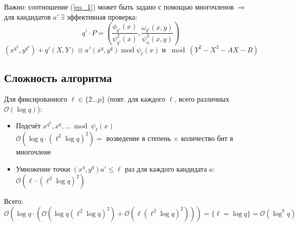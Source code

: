\documentclass[12pt]{article}
\newcommand{\bigO}{\mathcal{O}}
\theoremstyle{definition}
\theoremstyle{definition}
\theoremstyle{definition}
\begin{document}
Важно: соотношение (\ref{eq_1}) может быть задано с помощью многочленов $\Rightarrow$ для кандидатов $a'\ \exists$ эффективная проверка:
\[
    q'\cdot P = \left(\frac{\phi_{q'}(x)}{\psi^2_{q'}(x)}, \frac{\omega_{q'}(x,y)}{\psi^3_n(x,y)} \right)
\]
\[
    (x^{q^2}, y^{q^2}) + q'(X,Y) \equiv a'(x^q, y^q) \operatorname{mod} \psi_\ell(x) \text{ и } \bmod  (Y^2-X^3-AX-B)
\]

\subsection{Сложность алгоритма}

Для фиксированного $\ell\in\{2 \ldots p\}$ (повт. для каждого $\ell$, всего различных $\bigO(\log q)$):
\begin{itemize}
    \item Подсчёт $x^{q^2}, x^q, ... \bmod \psi_\ell(x)$\\
    $\bigO(\log q \cdot (\ell^2 \log q)^2) = $ возведение в степень $\times$ количество бит в многочлене
    
    \item Умножение точки $(x^q, y^q) a' \leq \ell$ раз для каждого кандидата $a:$\\
    $\bigO(\ell\cdot(\ell^2 \log q)^2)$
\end{itemize}
Всего: $\bigO(\log q \cdot(\bigO(\log q (\ell^2 \log q)^2) + \bigO(\ell(\ell^2 \log q)^2))) = \{\ell=\log q\} = \bigO(\log^8 q)$
\end{document}

